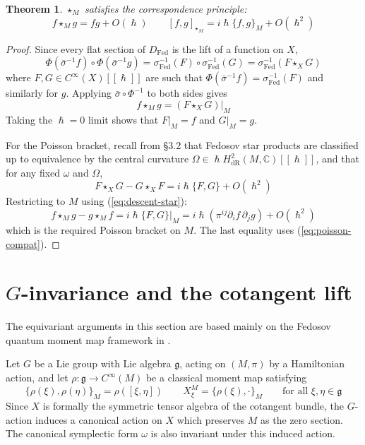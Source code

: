 \documentclass[
  12pt,
  a4paper, oneside
]{report}
\renewcommand{\hbar}{\hslash}
\theoremstyle{bolddef}
\newtheorem{theorem}{Theorem}[chapter]
\theoremstyle{remark}
\numberwithin{equation}{chapter}
\begin{document}
\begin{theorem}\label{thm:classical-limit}
$\star_M$ satisfies the correspondence principle:
\[
f \star_M g = fg + O(\hbar) \qquad [f, g]_{\star_M} = i\hbar\{f, g\}_M + O(\hbar^2)
\]
\end{theorem}
\begin{proof}
Since every flat section of $D_{\mathrm{Fed}}$ is the lift of a function on $X$,
\[
\Phi(\bar{\sigma}^{-1}f) \circ \Phi(\bar{\sigma}^{-1}g) = \sigma_{\mathrm{Fed}}^{-1}(F) \circ \sigma_{\mathrm{Fed}}^{-1}(G) = \sigma_{\mathrm{Fed}}^{-1}(F \star_X G)
\]
where $F, G \in C^\infty(X)[[\hbar]]$ are such that $\Phi(\bar{\sigma}^{-1}f) = \sigma_{\mathrm{Fed}}^{-1}(F)$ and similarly for $g$. Applying $\bar{\sigma} \circ \Phi^{-1}$ to both sides gives
\begin{equation}\label{eq:descent-star}
f \star_M g = (F \star_X G)\big|_M
\end{equation}
Taking the $\hbar = 0$ limit shows that $F|_M = f$ and $G|_M = g$.

For the Poisson bracket, recall from \S 3.2 that Fedosov star products are classified up to equivalence by the central curvature $\Omega \in \hbar H^2_{\mathrm{dR}}(M, \mathbb{C})[[\hbar]]$, and that for any fixed $\omega$ and $\Omega$,
\[
F \star_X G - G \star_X F = i\hbar\{F, G\} + O(\hbar^2)
\]
Restricting to $M$ using (\ref{eq:descent-star}):
\[
f \star_M g - g \star_M f = i\hbar\{F, G\}\big|_M = i\hbar(\pi^{ij}\partial_i f\, \partial_j g) + O(\hbar^2)
\]
which is the required Poisson bracket on $M$. The last equality uses (\ref{eq:poisson-compat}).
\end{proof}


\section*{$G$-invariance and the cotangent lift}
The equivariant arguments in this section are based mainly on the Fedosov quantum moment map framework in \cite{MBN,RW}.


Let $G$ be a Lie group with Lie algebra $\mathfrak{g}$, acting on $(M, \pi)$ by a Hamiltonian action, and let $\rho : \mathfrak{g} \to C^\infty(M)$ be a classical moment map satisfying
\begin{equation}\label{eq:class-moment}
\{\rho(\xi), \rho(\eta)\}_M = \rho([\xi, \eta]) \qquad X_\xi^M = \{\rho(\xi), \cdot\}_M \qquad \text{for all } \xi, \eta \in \mathfrak{g}
\end{equation}
Since $X$ is formally the symmetric tensor algebra of the cotangent bundle, the $G$-action induces a canonical action on $X$ which preserves $M$ as the zero section. The canonical symplectic form $\omega$ is also invariant under this induced action.
\end{document}
